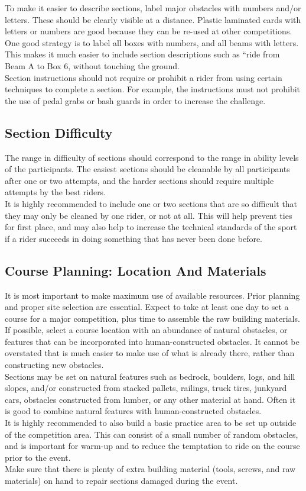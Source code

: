 To make it easier to describe sections, label major obstacles with numbers and/or letters. These should be clearly visible at a distance. Plastic laminated cards with letters or numbers are good because they can be re-used at other competitions.\\
One good strategy is to label all boxes with numbers, and all beams with letters. This makes it much easier to include
section descriptions such as “ride from Beam A to Box 6, without touching the ground.\\
Section instructions should not require or prohibit a rider from using certain techniques to complete a section. For example, the instructions must not prohibit the use of pedal grabs or bash guards in order to increase the challenge.
\subsection{Section Difficulty}
The range in difficulty of sections should correspond to the range in ability levels of the participants. The easiest
sections should be cleanable by all participants after one or two attempts, and the harder sections should require
multiple attempts by the best riders.\\
It is highly recommended to include one or two sections that are so difficult that they may only be cleaned by one rider,
or not at all. This will help prevent ties for first place, and may also help to increase the technical standards of the sport
if a rider succeeds in doing something that has never been done before.
\subsection{Course Planning: Location And Materials}
It is most important to make maximum use of available resources. Prior planning and proper site selection are essential.
Expect to take at least one day to set a course for a major competition, plus time to assemble the raw building
materials.\\
If possible, select a course location with an abundance of natural obstacles, or features that can be incorporated into
human-constructed obstacles. It cannot be overstated that is much easier to make use of what is already there, rather
than constructing new obstacles.\\
Sections may be set on natural features such as bedrock, boulders, logs, and hill slopes, and/or constructed from
stacked pallets, railings, truck tires, junkyard cars, obstacles constructed from lumber, or any other material at hand.
Often it is good to combine natural features with human-constructed obstacles.\\
It is highly recommended to also build a basic practice area to be set up outside of the competition area. This can
consist of a small number of random obstacles, and is important for warm-up and to reduce the temptation to ride on
the course prior to the event.\\
Make sure that there is plenty of extra building material (tools, screws, and raw materials) on hand to repair sections
damaged during the event.
